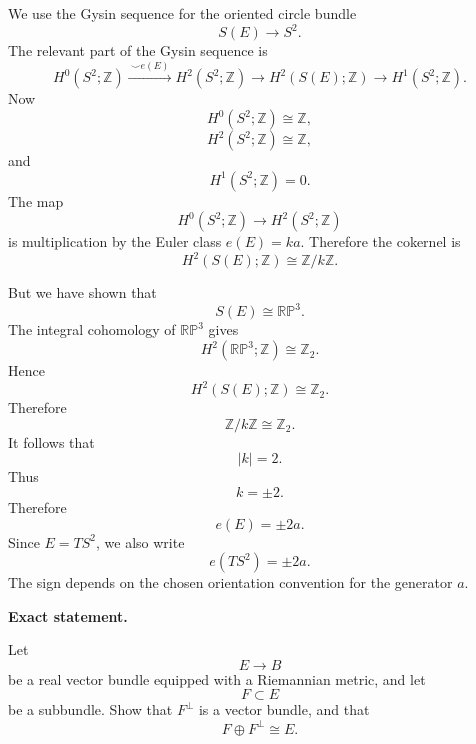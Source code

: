\begin{solution}
	We use the Gysin sequence for the oriented circle bundle
	\[
	S(E)\to S^{2}.
	\]
	The relevant part of the Gysin sequence is
	\[
	H^{0}(S^{2};\mathbb Z)
	\xrightarrow{\ \smile e(E)\ }
	H^{2}(S^{2};\mathbb Z)
	\longrightarrow
	H^{2}(S(E);\mathbb Z)
	\longrightarrow
	H^{1}(S^{2};\mathbb Z).
	\]
	Now
	\[
	H^{0}(S^{2};\mathbb Z)\cong \mathbb Z,
	\]
	\[
	H^{2}(S^{2};\mathbb Z)\cong \mathbb Z,
	\]
	and
	\[
	H^{1}(S^{2};\mathbb Z)=0.
	\]
	The map
	\[
	H^{0}(S^{2};\mathbb Z)\to H^{2}(S^{2};\mathbb Z)
	\]
	is multiplication by the Euler class \(e(E)=ka\). Therefore the cokernel is
	\[
	H^{2}(S(E);\mathbb Z)\cong \mathbb Z/k\mathbb Z.
	\]

	But we have shown that
	\[
	S(E)\cong \mathbb{RP}^{3}.
	\]
	The integral cohomology of \(\mathbb{RP}^{3}\) gives
	\[
	H^{2}(\mathbb{RP}^{3};\mathbb Z)\cong \mathbb Z_{2}.
	\]
	Hence
	\[
	H^{2}(S(E);\mathbb Z)\cong \mathbb Z_{2}.
	\]
	Therefore
	\[
	\mathbb Z/k\mathbb Z\cong \mathbb Z_{2}.
	\]
	It follows that
	\[
	|k|=2.
	\]
	Thus
	\[
	k=\pm 2.
	\]
	Therefore
	\[
	\boxed{e(E)=\pm 2a.}
	\]
	Since \(E=TS^{2}\), we also write
	\[
	\boxed{e(TS^{2})=\pm 2a.}
	\]
	The sign depends on the chosen orientation convention for the generator \(a\).
\end{solution}

\begin{problem}

\medskip
\noindent\textbf{Exact statement.}\par
\smallskip

	Let
	\[
	E\to B
	\]
	be a real vector bundle equipped with a Riemannian metric, and let
	\[
	F\subset E
	\]
	be a subbundle. Show that \(F^{\perp}\) is a vector bundle, and that
	\[
	F\oplus F^{\perp}\cong E.
	\]
\end{problem}

